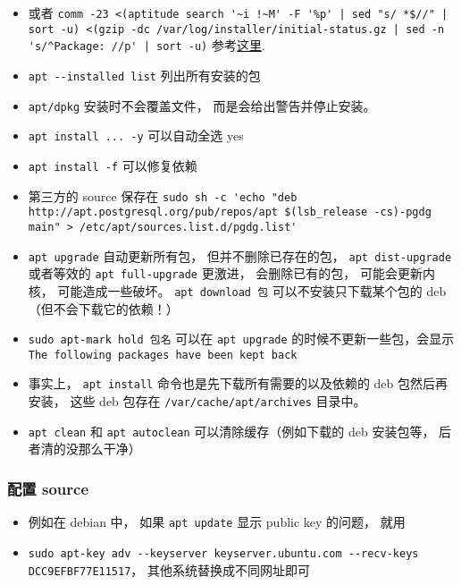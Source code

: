 \begin{itemize}
\item 或者 \verb`comm -23 <(aptitude search '~i !~M' -F '%p' | sed "s/ *$//" | sort -u) <(gzip -dc /var/log/installer/initial-status.gz | sed -n 's/^Package: //p' | sort -u)` 参考\href{https://askubuntu.com/questions/2389/how-to-list-manually-installed-packages}{这里}.
\item \verb`apt --installed list` 列出所有安装的包
\item \verb`apt/dpkg` 安装时不会覆盖文件， 而是会给出警告并停止安装。
\item \verb`apt install ... -y` 可以自动全选 yes
\item \verb`apt install -f` 可以修复依赖
\item 第三方的 source 保存在 \verb`sudo sh -c 'echo "deb http://apt.postgresql.org/pub/repos/apt $(lsb_release -cs)-pgdg main" > /etc/apt/sources.list.d/pgdg.list'`
\item \verb`apt upgrade` 自动更新所有包， 但并不删除已存在的包， \verb`apt dist-upgrade` 或者等效的 \verb`apt full-upgrade` 更激进， 会删除已有的包， 可能会更新内核， 可能造成一些破坏。
\verb`apt download 包` 可以不安装只下载某个包的 deb （但不会下载它的依赖！）
\item \verb`sudo apt-mark hold 包名` 可以在 \verb`apt upgrade` 的时候不更新一些包，会显示 \verb`The following packages have been kept back`
\item 事实上， \verb`apt install` 命令也是先下载所有需要的以及依赖的 deb 包然后再安装， 这些 deb 包存在 \verb`/var/cache/apt/archives` 目录中。
\item \verb`apt clean` 和 \verb`apt autoclean` 可以清除缓存（例如下载的 deb 安装包等， 后者清的没那么干净）
\end{itemize}


\subsubsection{配置 source}
\begin{itemize}
\item 例如在 debian 中， 如果 \verb`apt update` 显示 public key 的问题， 就用
\item \verb`sudo apt-key adv --keyserver keyserver.ubuntu.com --recv-keys DCC9EFBF77E11517`， 其他系统替换成不同网址即可
\end{itemize}

